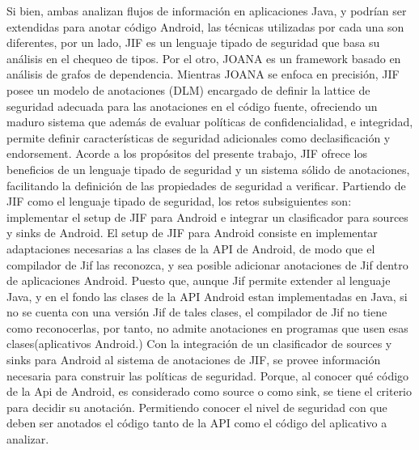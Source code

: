 Si bien, ambas analizan flujos de información en aplicaciones Java, y
podrían ser extendidas para anotar código Android, las técnicas utilizadas por cada una
son diferentes, por un lado, JIF es un lenguaje tipado de seguridad que basa su
análisis en el chequeo de tipos. Por el otro, JOANA es un framework basado en
análisis de grafos de dependencia. Mientras JOANA se enfoca en precisión, JIF
posee un modelo de anotaciones (DLM) encargado de definir la lattice de
seguridad adecuada para las anotaciones en el código fuente, ofreciendo un
maduro sistema que además de evaluar políticas de confidencialidad, e
integridad, permite definir características de seguridad adicionales como
declasificación y endorsement.
Acorde a los propósitos del presente trabajo, JIF ofrece los beneficios de un
lenguaje tipado de seguridad y un sistema  sólido  de anotaciones, facilitando
la definición de las propiedades de seguridad a verificar.\newline 
Partiendo de JIF como el lenguaje tipado de seguridad, los retos subsiguientes
son: implementar el setup de JIF para Android e integrar un clasificador
para sources y sinks de Android. 
El setup de JIF para Android consiste en implementar adaptaciones necesarias
a las clases de la API de Android, de modo que el compilador de Jif las
reconozca, y sea posible adicionar anotaciones de Jif dentro de aplicaciones
Android. Puesto que, aunque Jif permite extender al lenguaje Java, y en el fondo
las clases de la API Android estan implementadas en Java, si no se cuenta con
una versión Jif de tales clases, el compilador de Jif no tiene como
reconocerlas, por tanto, no admite anotaciones en programas que usen esas
clases(aplicativos Android.)\newline
Con la integración de un clasificador de sources y sinks para Android al sistema
de anotaciones de JIF, se provee información necesaria para construir las
políticas de seguridad. Porque, al conocer qué código de la Api de Android,
es considerado como source o como sink, se tiene el criterio para decidir su
anotación. Permitiendo conocer el nivel de seguridad con que deben ser
anotados el código tanto de la API como el código del aplicativo a
analizar.\newline
